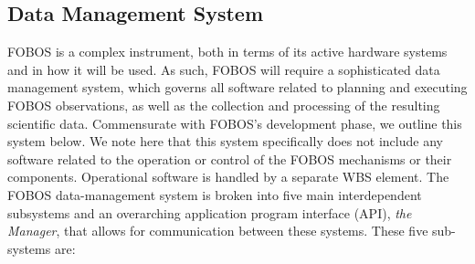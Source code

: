 \documentclass[oneside,11pt]{amsart}
\begin{document}

\subsection{Data Management System}

FOBOS is a complex instrument, both in terms of its active hardware
systems and in how it will be used. As such, FOBOS will require a
sophisticated data management system, which governs all software
related to planning and executing FOBOS observations, as well as the
collection and processing of the resulting scientific data.
Commensurate with FOBOS's development phase, we outline this system
below. We note here that this system specifically does not include
any software related to the operation or control of the FOBOS
mechanisms or their components. Operational software is handled by a
separate WBS element. The FOBOS data-management system is broken into
five main interdependent subsystems and an overarching application
program interface (API), {\it the Manager}, that allows for
communication between these systems. These five sub-systems are:
\end{document}
